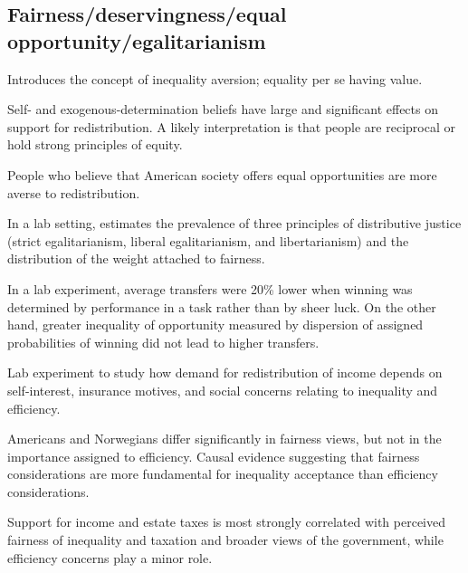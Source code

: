 \documentclass{article}
\newcommand{\citem}[1]{\medskip \noindent \textbf{\cite*{#1}}}
\begin{document}
\subsection{Fairness/deservingness/equal opportunity/egalitarianism}

\citem{fehr1999theory}

Introduces the concept of inequality aversion; equality per se having value.

\citem{fong2001social}

Self- and exogenous-determination beliefs have large and significant effects on support for
redistribution. A likely interpretation is that people are reciprocal or hold strong principles of equity.

\citem{alesina2005preferences}

People who believe that American society offers equal opportunities are more averse to redistribution.

\citem{cappelen2007pluralism}

In a lab setting, estimates the prevalence of three principles of distributive justice (strict egalitarianism, liberal egalitarianism, and libertarianism) and the distribution of the weight attached to fairness.

\citem{krawczyk2010glimpse}

In a lab experiment, average transfers were 20\% lower when winning was determined by performance in a task rather than by sheer luck. On the other hand, greater inequality of opportunity measured by dispersion of assigned probabilities of winning did not lead to higher transfers.

\citem{durante2014preferences}

Lab experiment to study how demand for redistribution of income depends on
self-interest, insurance motives, and social concerns relating to inequality and efficiency.

\citem{almaas2020cutthroat}

Americans and Norwegians differ significantly in fairness views, but not in the
importance assigned to efficiency. Causal evidence suggesting that fairness considerations are more fundamental for inequality acceptance than efficiency considerations.


\citem{stantcheva2021understanding}

Support for income and estate taxes is most strongly correlated with perceived fairness of inequality and taxation and broader views of the government, while efficiency concerns play a minor role.
\end{document}
